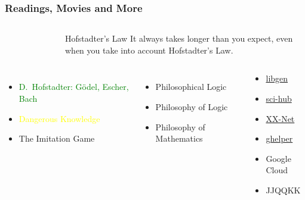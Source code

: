 \documentclass[UTF8,11pt,colorlinks,compress,openany]{beamer}%
\begin{document}
\begin{frame}\frametitle{Readings, Movies and More}
	\begin{columns}
		\begin{figure}[H]
		\end{figure}
\begin{block}{Hofstadter's Law}
It always takes longer than you expect, even when you take into account Hofstadter's Law.
\end{block}
	\end{columns}
\begin{columns}
		\column{.56\textwidth}
			\begin{itemize}
				\item \textcolor{green}{D.~Hofstadter: G\"odel, Escher, Bach}
				\item \textcolor{yellow}{Dangerous Knowledge}
				\item The Imitation Game
			\end{itemize}
			\begin{itemize}
				\item Philosophical Logic
				\item Philosophy of Logic
				\item Philosophy of Mathematics
			\end{itemize}
		\begin{block}{}
			\begin{itemize}
				\item \href{https://en.wikipedia.org/wiki/Library_Genesis}{libgen}
				\item \href{https://en.wikipedia.org/wiki/Sci-Hub}{sci-hub}
				\item \href{https://github.com/XX-net/XX-Net}{XX-Net}
				\item \href{http://googlehelper.net/}{ghelper}
				\item Google Cloud
				\item JJQQKK
			\end{itemize}
		\end{block}
\end{columns}
\end{frame}
\end{document}
